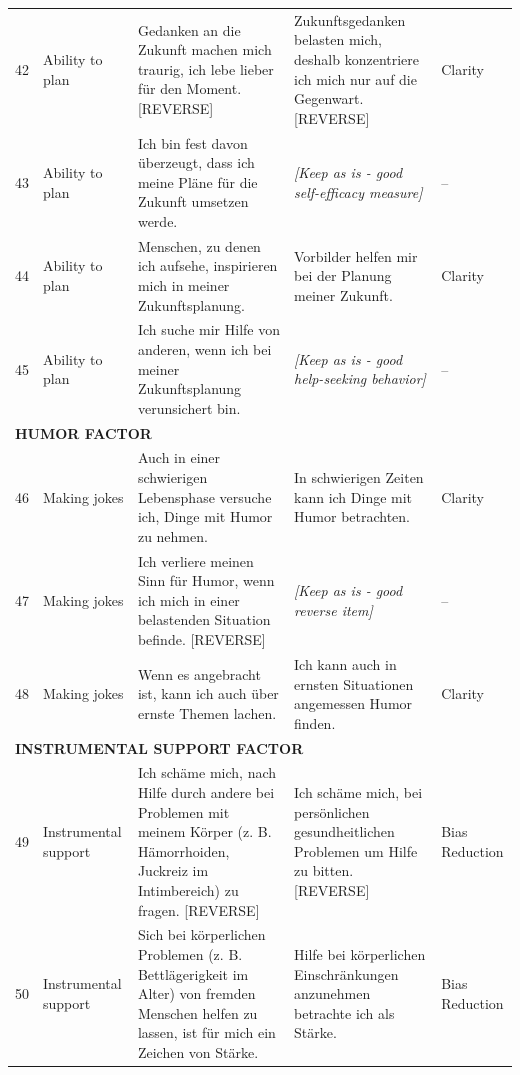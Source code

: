 \documentclass[12pt,a4paper]{article}
\begin{document}
\begin{longtable}{p{}p{}p{}p{}p{}}
42 & Ability to plan & Gedanken an die Zukunft machen mich traurig, ich lebe lieber für den Moment. [REVERSE] & Zukunftsgedanken belasten mich, deshalb konzentriere ich mich nur auf die Gegenwart. [REVERSE] & Clarity \\

43 & Ability to plan & Ich bin fest davon überzeugt, dass ich meine Pläne für die Zukunft umsetzen werde. & \textit{[Keep as is - good self-efficacy measure]} & -- \\

44 & Ability to plan & Menschen, zu denen ich aufsehe, inspirieren mich in meiner Zukunftsplanung. & Vorbilder helfen mir bei der Planung meiner Zukunft. & Clarity \\

45 & Ability to plan & Ich suche mir Hilfe von anderen, wenn ich bei meiner Zukunftsplanung verunsichert bin. & \textit{[Keep as is - good help-seeking behavior]} & -- \\

\midrule
\multicolumn{5}{l}{\textbf{HUMOR FACTOR}} \\
\midrule

46 & Making jokes & Auch in einer schwierigen Lebensphase versuche ich, Dinge mit Humor zu nehmen. & In schwierigen Zeiten kann ich Dinge mit Humor betrachten. & Clarity \\

47 & Making jokes & Ich verliere meinen Sinn für Humor, wenn ich mich in einer belastenden Situation befinde. [REVERSE] & \textit{[Keep as is - good reverse item]} & -- \\

48 & Making jokes & Wenn es angebracht ist, kann ich auch über ernste Themen lachen. & Ich kann auch in ernsten Situationen angemessen Humor finden. & Clarity \\

\midrule
\multicolumn{5}{l}{\textbf{INSTRUMENTAL SUPPORT FACTOR}} \\
\midrule

49 & Instrumental support & Ich schäme mich, nach Hilfe durch andere bei Problemen mit meinem Körper (z. B. Hämorrhoiden, Juckreiz im Intimbereich) zu fragen. [REVERSE] & Ich schäme mich, bei persönlichen gesundheitlichen Problemen um Hilfe zu bitten. [REVERSE] & Bias Reduction \\

50 & Instrumental support & Sich bei körperlichen Problemen (z. B. Bettlägerigkeit im Alter) von fremden Menschen helfen zu lassen, ist für mich ein Zeichen von Stärke. & Hilfe bei körperlichen Einschränkungen anzunehmen betrachte ich als Stärke. & Bias Reduction \\


\end{longtable}
\end{document}
